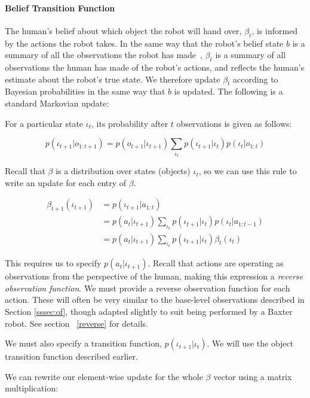 \documentclass[conference]{IEEEtran}
\begin{document}
\paragraph{Belief Transition Function}

The human's belief about which object the robot will hand over, $\beta_t$, is informed by the actions the robot takes. In the same way that the robot's belief state $b$ is a summary of all the observations the robot has made~\citep{kaelbling99}, $\beta_t$ is a summary of all observations the human has made of the robot's actions, and reflects the human's estimate about the robot's true state. We therefore update $\beta_t$ according to Bayesian probabilities in the same way that $b$ is updated. The following is a standard Markovian update: 

For a particular state $\iota_t$, its probability after $t$ observations is given as follows: 

\begin{equation*}
	p(\iota_{t+1} | o_{1:t+1}) = p(o_{t+1} | \iota_{t+1}) \sum_{\iota_{t}} p(\iota_{t+1} | \iota_{t}) p (\iota_{t} | o_{1:t})
\end{equation*}

Recall that $\beta$ is a distribution over states (objects) $\iota_t$, so we can use this rule to write an update for each entry of $\beta$. 

\begin{align*}
	\beta_{t+1}(\iota_{t+1})&= p(\iota_{t+1} | a_{1:t})  \\
	&= p(a_{t} | \iota_{t+1}) \sum_{\iota_{t}} p(\iota_{t+1} | \iota_{t}) p (\iota_{t} | a_{1:t-1}) \\ 
	&= p(a_{t} | \iota_{t+1}) \sum_{\iota_{t}} p(\iota_{t+1} | \iota_{t}) \beta_{t}(\iota_{t}) 
\end{align*}

This requires us to specify $p(a_{t} | \iota_{t+1})$. Recall that actions are operating as observations from the perspective of the human, making this expression a \emph{reverse observation function}. We must provide a reverse observation function for each action. These will often be very similar to the base-level observations described in Section \ref{sssec:of}, though adapted slightly to suit being performed by a Baxter robot. See section ~\ref{reverse} for details. 

We must also specify a transition function, $p(\iota_{t+1} | \iota_t)$. We will use the object transition function described earlier. 

We can rewrite our element-wise update for the whole $\beta$ vector using a matrix multiplication: 
\end{document}
